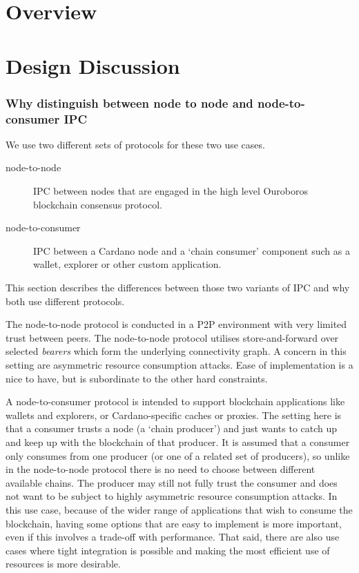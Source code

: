 \documentclass{report}
\newcommand{\wip}[1]{\color{magenta}{#1}\color{black}}
\theoremstyle{definition}{
  \newtheorem{lemma}{Lemma}[section] %
  \newtheorem{definition}[lemma]{Definition}
}
\theoremstyle{theorem}{
  \newtheorem{invariant}[lemma]{Invariant}
  \newtheorem{proofobligation}[lemma]{Proof Obligation}
}
\numberwithin{equation}{lemma}
\begin{document}
\wip{WIP: Poldercast,etc}
\section{Overview}
\section{Design Discussion}
\subsubsection{Why distinguish between node to node and node-to-consumer IPC}
\label{why_distinguish_protocols}
We use two different sets of protocols for these two use cases.

\begin{description}
\item[node-to-node] IPC between nodes that are engaged in the high level Ouroboros
      blockchain consensus protocol.
\item[node-to-consumer] IPC between a Cardano node and a `chain consumer' component such as a
      wallet, explorer or other custom application.
\end{description}

This section describes the differences between those two variants of IPC and why both use
different protocols.

The node-to-node protocol is conducted in a P2P environment
with very limited trust between peers. The node-to-node protocol utilises
store-and-forward over selected \emph{bearers} which form the underlying
connectivity graph. A concern in this setting are asymmetric resource
consumption attacks. Ease of implementation is a nice to have, but is
subordinate to the other hard constraints.

A node-to-consumer protocol is intended to support blockchain applications
like wallets and explorers, or Cardano-specific caches or proxies. The setting
here is that a consumer trusts a node (a `chain producer') and just wants to
catch up and keep up with the blockchain of that producer. It is assumed that
a consumer only consumes from one producer (or one of a related set of
producers), so unlike in the node-to-node protocol there is no need to choose
between different available chains. The producer may still not fully trust the
consumer and does not want to be subject to highly asymmetric resource
consumption attacks. In this use case, because of the wider range of
applications that wish to consume the blockchain, having some options that are
easy to implement is more important, even if this involves a trade-off with
performance. That said, there are also use cases where tight integration is
possible and making the most efficient use of resources is more desirable.
\end{document}
